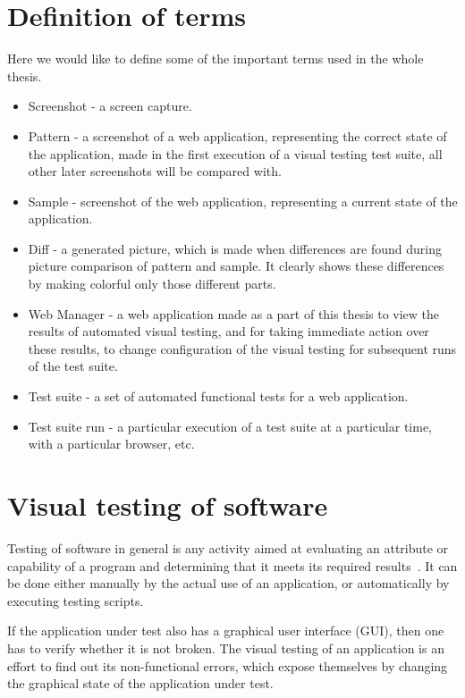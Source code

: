 \documentclass[11pt,oneside,final]{fithesis2}
\begin{document}
\chapter{Definition of terms}
Here we would like to define some of the important terms used in the whole thesis.

\begin{itemize}
 \item Screenshot - a screen capture.
 \item Pattern - a screenshot of a web application, representing the correct state of the application, made in the first execution of 
 a visual testing test suite, all other later screenshots will be compared with.
 \item Sample - screenshot of the web application, representing a current state of the application.
 \item Diff - a generated picture, which is made when differences are found during picture comparison of pattern and sample. It clearly
 shows these differences by making colorful only those different parts.
 \item Web Manager - a web application made as a part of this thesis to view the results of automated visual testing, and for taking immediate
 action over these results, to change configuration of the visual testing for subsequent runs of the test suite.
 \item Test suite - a set of automated functional tests for a web application.
 \item Test suite run - a particular execution of a test suite at a particular time, with a particular browser, etc.
\end{itemize}


\chapter{Visual testing of software}    
    Testing of software in general is any activity aimed at evaluating an attribute or capability of a program and determining that it meets its required results~\citep{Hetzel}. 
    It can be done either manually by the actual use of an application, or automatically by executing testing scripts.
    
    If the application under test also has a graphical user interface (GUI), then one has to verify whether it is not broken. 
    The visual testing of an application is an effort to find out its non-functional errors, which expose themselves by changing the graphical state of the application under test.
    
\end{document}
